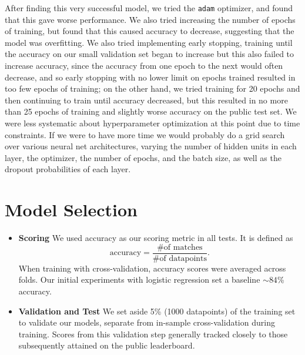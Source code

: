 \begin{itemize}
\begin{itemize}
    After finding this very successful model, we tried the \texttt{adam} optimizer, and found that this gave worse performance. We also tried increasing the number of epochs of training, but found that this caused accuracy to decrease, suggesting that the model was overfitting. We also tried implementing early stopping, training until the accuracy on our small validation set began to increase but this also failed to increase accuracy, since the accuracy from one epoch to the next would often decrease, and so early stopping with no lower limit on epochs trained resulted in too few epochs of training; on the other hand, we tried training for 20 epochs and then continuing to train until accuracy decreased, but this resulted in no more than 25 epochs of training and slightly worse accuracy on the public test set. We were less systematic about hyperparameter optimization at this point due to time constraints. If we were to have more time we would probably do a grid search over various neural net architectures, varying the number of hidden units in each layer, the optimizer, the number of epochs, and the batch size, as well as the dropout probabilities of each layer. 
  \end{itemize}

\end{itemize}


\section{Model Selection}
\medskip
\begin{itemize}
  
\item \textbf{Scoring} 
  We used accuracy as our scoring metric in all tests. It is defined as
  $$
  \text{accuracy}=\frac{\text{\# of matches}}{\text{\# of datapoints}}.
  $$
  When training with cross-validation, accuracy scores were averaged across folds. Our initial experiments with logistic regression set a baseline $\sim 84$\% accuracy. 
\item \textbf{Validation and Test} 
  We set aside 5\% (1000 datapoints) of the training set to validate our models, separate from in-sample cross-validation during training. Scores from this validation step generally tracked closely to those subsequently attained on the public leaderboard. 
  
\end{itemize}




